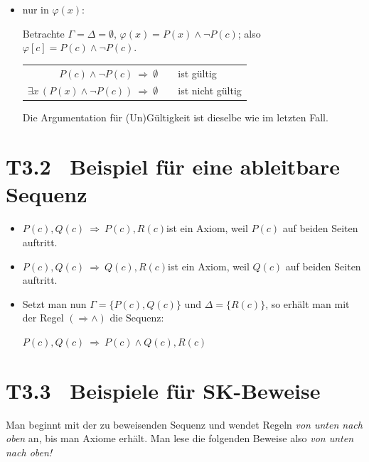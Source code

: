 \documentclass[fontsize=11pt, twoside=false, numbers=autoenddot]{scrbook}
\begin{document}
\begin{itemize}
  \item
    nur in $\varphi(x)$:
    \par\smallskip
    Betrachte $\Gamma = \Delta = \emptyset$, $\varphi(x) = P(x) \land \lnot P(c)$; also $\varphi[c] = P(c) \land \lnot P(c)$.
    \par\smallskip
    \begin{center}
      \begin{tabular}{r@{~}c@{\qquad}l@{}}
        $P(c) \land \lnot P(c) ~\Rightarrow~ \emptyset$              & & ist gültig \\[2pt]\cline{1-1}
        \rule{0pt}{12pt}%
        $\exists x\,(P(x) \land \lnot P(c)) ~\Rightarrow~ \emptyset$ & & ist nicht gültig
      \end{tabular}
    \end{center}
    \par\smallskip
    Die Argumentation für (Un)Gültigkeit ist dieselbe wie im letzten Fall.
\end{itemize}



\section*{T3.2~ Beispiel für eine ableitbare Sequenz}

\begin{itemize}
  \item
    $P(c),Q(c) ~\Rightarrow~ P(c),R(c)$\quad  ist ein Axiom, weil $P(c)$ auf beiden Seiten auftritt.
  \item
    $P(c),Q(c) ~\Rightarrow~ Q(c),R(c)$\quad  ist ein Axiom, weil $Q(c)$ auf beiden Seiten auftritt.
  \item
    Setzt man nun $\Gamma = \{P(c),Q(c)\}$ und $\Delta = \{R(c)\}$,
    so erhält man mit der Regel $(\Rightarrow \land)$ die Sequenz:

    $P(c),Q(c) ~\Rightarrow~ P(c) \land Q(c), R(c)$
\end{itemize}

\section*{T3.3~ Beispiele für SK-Beweise}

Man beginnt mit der zu beweisenden Sequenz und wendet Regeln \emph{von unten nach oben} an,
bis man Axiome erhält. Man lese die folgenden Beweise also \emph{von unten nach oben!}
\end{document}
